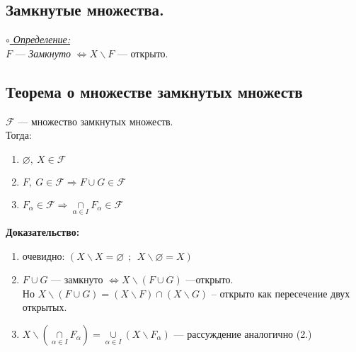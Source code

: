 \documentclass[10pt]{report}
\begin{document}
\begin{spacing}{1.5}
  \section{Замкнутые множества.}
\underline{\textit{$\circ$ Определение:}}\\
$F$ --- \emph{Замкнуто} $\Longleftrightarrow X\backslash F$ --- открыто.
\subsection{Теорема о множестве замкнутых множеств}
$ \mathcal{F} $ --- множество замкнутых множеств.
\\Тогда:
\begin{enumerate}
\item $\varnothing ,~X\in \mathcal{F}$
\item $F,~G\in \mathcal{F} \Longrightarrow F\cup G\in \mathcal{F}$
\item $F_{\alpha}\in \mathcal{F} \Longrightarrow \underset{\alpha\in I}{\cap}F_{\alpha}\in \mathcal{F}$
\end{enumerate}
 \textbf{Доказательство:}
 \begin{enumerate}
 	\item очевидно: $(X\backslash X = \varnothing~~;~~X\backslash \varnothing = X)$
 	\item $F\cup G$ --- замкнуто $\Longleftrightarrow X\backslash (F\cup G)$ ---открыто.\\
 	Но $X\backslash (F\cup G) = (X\backslash F)\cap(X\backslash G)$ -- открыто как пересечение двух открытых.
 	\item $X\backslash(\underset{\alpha\in I}{\cap}F_{\alpha}) = \underset{\alpha\in I}{\cup}(X\backslash F_{\alpha})$ --- рассуждение аналогично (2.)

\end{enumerate}

\end{spacing}
\end{document}
